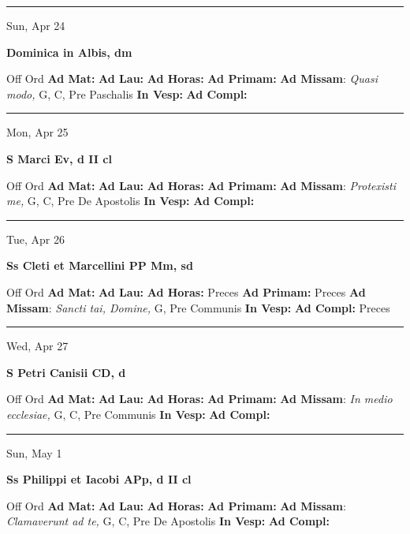 \documentclass[letterpaper, 10pt]{article}
\begin{document}
\hrule
\begin{center}
Sun, Apr 24
\end{center}\textbf{ \large Dominica in Albis, \textnormal{\normalsize dm}}
\begin{justify}
Off Ord
\textbf{Ad Mat: }
\textbf{Ad Lau: }
\textbf{Ad Horas: }
\textbf{Ad Primam: }
\textbf{Ad Missam}: \textit{Quasi modo,} G, C, Pre Paschalis
\textbf{In Vesp: }
\textbf{Ad Compl: }\end{justify}



\hrule
\begin{center}
Mon, Apr 25
\end{center}\textbf{ \large S Marci Ev, \textnormal{\normalsize d II cl}}
\begin{justify}
Off Ord
\textbf{Ad Mat: }
\textbf{Ad Lau: }
\textbf{Ad Horas: }
\textbf{Ad Primam: }
\textbf{Ad Missam}: \textit{Protexisti me,} G, C, Pre De Apostolis
\textbf{In Vesp: }
\textbf{Ad Compl: }\end{justify}



\hrule
\begin{center}
Tue, Apr 26
\end{center}\textbf{ \large Ss Cleti et Marcellini PP Mm, \textnormal{\normalsize sd}}
\begin{justify}
Off Ord
\textbf{Ad Mat: }
\textbf{Ad Lau: }
\textbf{Ad Horas: }Preces
\textbf{Ad Primam: }Preces
\textbf{Ad Missam}: \textit{Sancti tai, Domine,} G, Pre Communis
\textbf{In Vesp: }
\textbf{Ad Compl: }Preces\end{justify}



\hrule
\begin{center}
Wed, Apr 27
\end{center}\textbf{ \large S Petri Canisii CD, \textnormal{\normalsize d}}
\begin{justify}
Off Ord
\textbf{Ad Mat: }
\textbf{Ad Lau: }
\textbf{Ad Horas: }
\textbf{Ad Primam: }
\textbf{Ad Missam}: \textit{In medio ecclesiae,} G, C, Pre Communis
\textbf{In Vesp: }
\textbf{Ad Compl: }\end{justify}



\hrule
\begin{center}
Sun, May 1
\end{center}\textbf{ \large Ss Philippi et Iacobi APp, \textnormal{\normalsize d II cl}}
\begin{justify}
Off Ord
\textbf{Ad Mat: }
\textbf{Ad Lau: }
\textbf{Ad Horas: }
\textbf{Ad Primam: }
\textbf{Ad Missam}: \textit{Clamaverunt ad te,} G, C, Pre De Apostolis
\textbf{In Vesp: }
\textbf{Ad Compl: }\end{justify}
\end{document}
